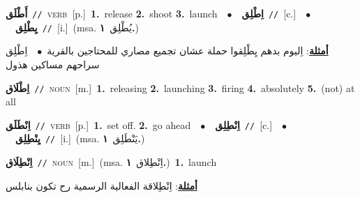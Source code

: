 \documentclass[10pt,a4paper,twoside]{article} %
\begin{document}
\begin{multicols}{2}
{\setlength\topsep{0pt}\textbf{\foreignlanguage{arabic}{أَطْلَق}}\ {\color{gray}\texttt{//}\color{black}}\ \textsc{verb}\ [p.]\ \textbf{1.}~release  \textbf{2.}~shoot  \textbf{3.}~launch\ \ $\bullet$\ \ \setlength\topsep{0pt}\textbf{\foreignlanguage{arabic}{اِطْلِق}}\ {\color{gray}\texttt{//}\color{black}}\ [c.]\ \ $\bullet$\ \ \setlength\topsep{0pt}\textbf{\foreignlanguage{arabic}{يِطْلِق}}\ {\color{gray}\texttt{//}\color{black}}\ [i.]\ \color{gray}(msa. \foreignlanguage{arabic}{يُطْلِق}~\foreignlanguage{arabic}{\textbf{١.}})\color{black}\  \begin{flushright}\color{gray}\foreignlanguage{arabic}{\textbf{\underline{\foreignlanguage{arabic}{أمثلة}}}: اِليوم بدهم يِطْلِقوا حملة عشان تجميع مصاري للمحتاجين بالقرية\ $\bullet$\ \  اِطْلِق سراحهم مساكين هذول}\end{flushright}\color{black}} \vspace{2mm}

{\setlength\topsep{0pt}\textbf{\foreignlanguage{arabic}{اِطْلَاق}}\ {\color{gray}\texttt{//}\color{black}}\ \textsc{noun}\ [m.]\ \textbf{1.}~releasing  \textbf{2.}~launching  \textbf{3.}~firing  \textbf{4.}~absolutely  \textbf{5.}~(not) at all\ } \vspace{2mm}

{\setlength\topsep{0pt}\textbf{\foreignlanguage{arabic}{اِنْطَلَق}}\ {\color{gray}\texttt{//}\color{black}}\ \textsc{verb}\ [p.]\ \textbf{1.}~set off.  \textbf{2.}~go ahead\ \ $\bullet$\ \ \setlength\topsep{0pt}\textbf{\foreignlanguage{arabic}{اِنْطِلِق}}\ {\color{gray}\texttt{//}\color{black}}\ [c.]\ \ $\bullet$\ \ \setlength\topsep{0pt}\textbf{\foreignlanguage{arabic}{يِنْطِلِق}}\ {\color{gray}\texttt{//}\color{black}}\ [i.]\ \color{gray}(msa. \foreignlanguage{arabic}{يَنْطَلِق}~\foreignlanguage{arabic}{\textbf{١.}})\color{black}\ } \vspace{2mm}

{\setlength\topsep{0pt}\textbf{\foreignlanguage{arabic}{اِنْطِلَاق}}\ {\color{gray}\texttt{//}\color{black}}\ \textsc{noun}\ [m.]\ \color{gray}(msa. \foreignlanguage{arabic}{اِنْطِلاق}~\foreignlanguage{arabic}{\textbf{١.}})\color{black}\ \textbf{1.}~launch\  \begin{flushright}\color{gray}\foreignlanguage{arabic}{\textbf{\underline{\foreignlanguage{arabic}{أمثلة}}}: اِنْطِلاقة الفعالية الرسمية رح تكون بنابلس}\end{flushright}\color{black}} \vspace{2mm}


\end{multicols}
\end{document}
